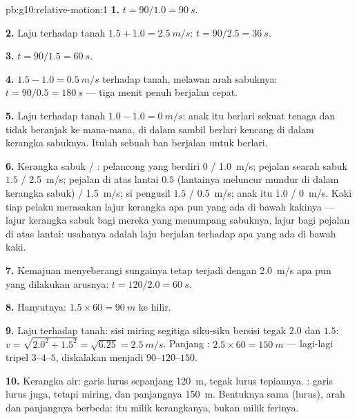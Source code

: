 \begin{solution}{pb:g10:relative-motion:1}
\textbf{1.} $t = 90/1.0 = \qty{90}{s}$.

\textbf{2.} Laju terhadap tanah $1.5 + 1.0 = \qty{2.5}{m/s}$:
$t = 90/2.5 = \qty{36}{s}$.

\textbf{3.} $t = 90/1.5 = \qty{60}{s}$.

\textbf{4.} $1.5 - 1.0 = \qty{0.5}{m/s}$ terhadap tanah, melawan arah
sabuknya: $t = 90/0.5 = \qty{180}{s}$ --- tiga menit penuh berjalan
cepat.

\textbf{5.} Laju terhadap tanah $1.0 - 1.0 = \qty{0}{m/s}$: anak itu
berlari sekuat tenaga dan tidak beranjak ke mana-mana,  di dalam
 sambil berlari kencang di dalam kerangka sabuknya. Itulah
sebuah ban berjalan untuk berlari.

\textbf{6.} Kerangka sabuk / : pelancong yang berdiri $0$
/ \qty{1.0}{m/s}; pejalan searah sabuk $1.5$ / \qty{2.5}{m/s}; pejalan
di atas lantai $0.5$ (lantainya meluncur mundur di dalam kerangka
sabuk) / \qty{1.5}{m/s}; si pengusil $1.5$ / \qty{0.5}{m/s}; anak itu
$1.0$ / \qty{0}{m/s}. Kaki tiap pelaku merasakan lajur kerangka apa pun
yang ada di bawah kakinya --- lajur kerangka sabuk bagi mereka yang
menumpang sabuknya, lajur  bagi pejalan di atas lantai:
usahanya adalah laju berjalan terhadap apa yang ada di bawah kaki.

\textbf{7.} Kemajuan menyeberangi sungainya tetap terjadi dengan
\qty{2.0}{m/s} apa pun yang dilakukan arusnya:
$t = 120/2.0 = \qty{60}{s}$.

\textbf{8.} Hanyutnya: $1.5 \times 60 = \qty{90}{m}$ ke hilir.

\textbf{9.} Laju terhadap tanah: sisi miring segitiga siku-siku bersisi
tegak $2.0$ dan $1.5$: $v = \sqrt{2.0^2 + 1.5^2} = \sqrt{6.25}
= \qty{2.5}{m/s}$. Panjang :
$2.5 \times 60 = \qty{150}{m}$ --- lagi-lagi tripel $3$--$4$--$5$,
diskalakan menjadi $90$--$120$--$150$.

\textbf{10.} Kerangka air: garis lurus sepanjang \qty{120}{m}, tegak
lurus tepiannya. : garis lurus juga, tetapi miring, dan
panjangnya \qty{150}{m}. Bentuknya sama (lurus), arah dan panjangnya
berbeda:  itu milik kerangkanya, bukan milik ferinya.


\end{solution}
